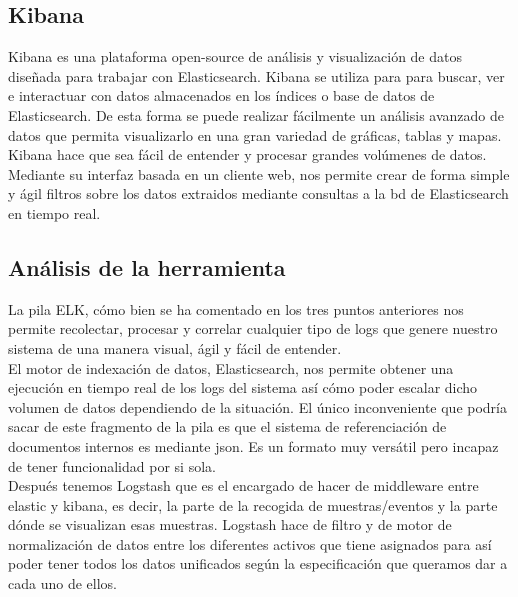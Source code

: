 \subsection{Kibana}
Kibana es una plataforma open-source de análisis y visualización de datos diseñada para trabajar con Elasticsearch. Kibana se utiliza para para buscar, ver e interactuar con datos almacenados en los índices o base de datos de Elasticsearch. De esta forma se puede realizar fácilmente un análisis avanzado de datos que permita visualizarlo en una gran variedad de gráficas, tablas y mapas.\\

Kibana hace que sea fácil de entender y procesar grandes volúmenes de datos. Mediante su interfaz basada en un cliente web, nos permite crear de forma simple y ágil filtros sobre los datos extraidos mediante consultas a la bd de Elasticsearch en tiempo real.\\


\subsection{Análisis de la herramienta}

La pila ELK, cómo bien se ha comentado en los tres puntos anteriores nos permite recolectar, procesar y correlar cualquier tipo de logs que genere nuestro sistema de una manera visual, ágil y fácil de entender. \\

El motor de indexación de datos, Elasticsearch, nos permite obtener una ejecución en tiempo real de los logs del sistema así cómo poder escalar dicho volumen de datos dependiendo de la situación. El único inconveniente que podría sacar de este fragmento de la pila es que el sistema de referenciación de documentos internos es mediante json. Es un formato muy versátil pero incapaz de tener funcionalidad por si sola.\\

Después tenemos Logstash que es el encargado de hacer de middleware entre elastic y kibana, es decir, la parte de la recogida de muestras/eventos y la parte dónde se visualizan esas muestras. Logstash hace de filtro y de motor de normalización de datos entre los diferentes activos que tiene asignados para así poder tener todos los datos unificados según la especificación que queramos dar a cada uno de ellos. \\

